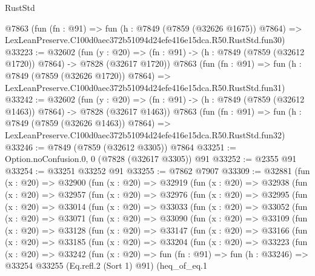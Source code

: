 \begin{lexlean}{RustStd}
\begin{coremodule}
    @7863
    (fun (fn : @91) =>
    fun (h : @7849 (@7859 (@32626 @1675)) @7864) =>
    LexLeanPreserve.C100d0aec372b51094d24efe416e15dca.R50.RustStd.fun30)
@33223 := @32602
    (fun (y : @20) =>
    (fn : @91) -> (h : @7849 (@7859 (@32612 @1720)) @7864) -> @7828 (@32617 @1720))
    @7863
    (fun (fn : @91) =>
    fun (h : @7849 (@7859 (@32626 @1720)) @7864) =>
    LexLeanPreserve.C100d0aec372b51094d24efe416e15dca.R50.RustStd.fun31)
@33242 := @32602
    (fun (y : @20) =>
    (fn : @91) -> (h : @7849 (@7859 (@32612 @1463)) @7864) -> @7828 (@32617 @1463))
    @7863
    (fun (fn : @91) =>
    fun (h : @7849 (@7859 (@32626 @1463)) @7864) =>
    LexLeanPreserve.C100d0aec372b51094d24efe416e15dca.R50.RustStd.fun32)
@33246 := @7849 (@7859 (@32612 @3305)) @7864
@33251 := Option.noConfusion.{0, 0} (@7828 (@32617 @3305)) @91
@33252 := @2355 @91
@33254 := @33251 @33252 @91
@33255 := @7862 @7907
@33309 := @32881
    (fun (x : @20) =>
    @32900
      (fun (x : @20) =>
      @32919
        (fun (x : @20) =>
        @32938
          (fun (x : @20) =>
          @32957
            (fun (x : @20) =>
            @32976
              (fun (x : @20) =>
              @32995
                (fun (x : @20) =>
                @33014
                  (fun (x : @20) =>
                  @33033
                    (fun (x : @20) =>
                    @33052
                      (fun (x : @20) =>
                      @33071
                        (fun (x : @20) =>
                        @33090
                          (fun (x : @20) =>
                          @33109
                            (fun (x : @20) =>
                            @33128
                              (fun (x : @20) =>
                              @33147
                                (fun (x : @20) =>
                                @33166
                                  (fun (x : @20) =>
                                  @33185
                                    (fun (x : @20) =>
                                    @33204
                                      (fun (x : @20) =>
                                      @33223
                                        (fun (x : @20) =>
                                        @33242
                                          (fun (x : @20) =>
                                          fun (fn : @91) =>
                                          fun (h : @33246) =>
                                          @33254
                                            @33255
                                            (Eq.refl.{2} (Sort 1) @91)
                                            (heq_of_eq.{1}

\end{coremodule}
\end{lexlean}
